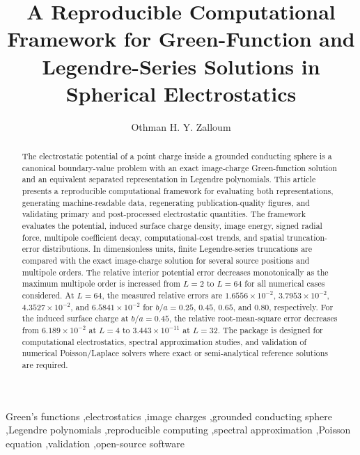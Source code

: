 \documentclass[preprint,12pt]{elsarticle}
\begin{document}
\begin{frontmatter}

\title{A Reproducible Computational Framework for Green-Function and Legendre-Series Solutions in Spherical Electrostatics}

\author[ppu]{Othman H. Y. Zalloum}
\address[ppu]{Department of Applied Mathematics and Physics, Palestine Polytechnic University, Hebron, Palestine}

\begin{abstract}
The electrostatic potential of a point charge inside a grounded conducting sphere is a canonical boundary-value problem with an exact image-charge Green-function solution and an equivalent separated representation in Legendre polynomials. This article presents a reproducible computational framework for evaluating both representations, generating machine-readable data, regenerating publication-quality figures, and validating primary and post-processed electrostatic quantities. The framework evaluates the potential, induced surface charge density, image energy, signed radial force, multipole coefficient decay, computational-cost trends, and spatial truncation-error distributions. In dimensionless units, finite Legendre-series truncations are compared with the exact image-charge solution for several source positions and multipole orders. The relative interior potential error decreases monotonically as the maximum multipole order is increased from $L=2$ to $L=64$ for all numerical cases considered. At $L=64$, the measured relative errors are $1.6556\times10^{-2}$, $3.7953\times10^{-2}$, $4.3527\times10^{-2}$, and $6.5841\times10^{-2}$ for $b/a=0.25$, $0.45$, $0.65$, and $0.80$, respectively. For the induced surface charge at $b/a=0.45$, the relative root-mean-square error decreases from $6.189\times10^{-2}$ at $L=4$ to $3.443\times10^{-11}$ at $L=32$. The package is designed for computational electrostatics, spectral approximation studies, and validation of numerical Poisson/Laplace solvers where exact or semi-analytical reference solutions are required.
\end{abstract}

\begin{keyword}
Green's functions \sep electrostatics \sep image charges \sep grounded conducting sphere \sep Legendre polynomials \sep reproducible computing \sep spectral approximation \sep Poisson equation \sep validation \sep open-source software
\end{keyword}

\end{frontmatter}
\end{document}
